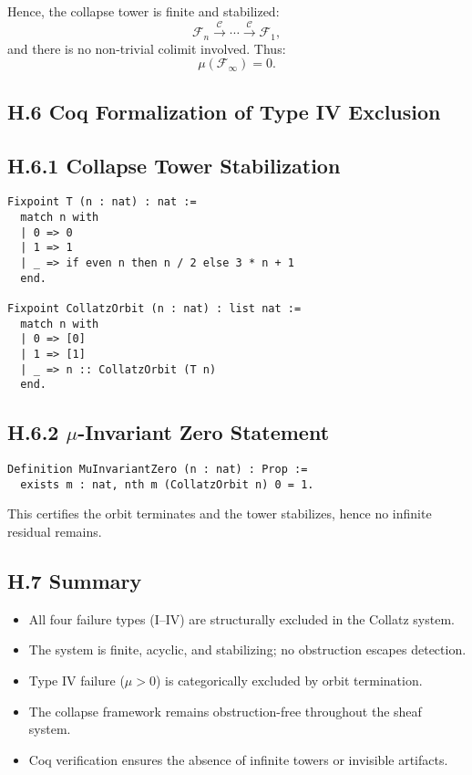 \documentclass[11pt]{article}
\begin{document}
Hence, the collapse tower is finite and stabilized:
\[
\mathcal{F}_n \xrightarrow{\mathcal{C}} \cdots \xrightarrow{\mathcal{C}} \mathcal{F}_1,
\]
and there is no non-trivial colimit involved. Thus:
\[
\mu(\mathcal{F}_\infty) = 0.
\]

\subsection*{H.6 Coq Formalization of Type IV Exclusion}

\subsection*{H.6.1 Collapse Tower Stabilization}

\begin{lstlisting}[language=Coq]
Fixpoint T (n : nat) : nat :=
  match n with
  | 0 => 0
  | 1 => 1
  | _ => if even n then n / 2 else 3 * n + 1
  end.

Fixpoint CollatzOrbit (n : nat) : list nat :=
  match n with
  | 0 => [0]
  | 1 => [1]
  | _ => n :: CollatzOrbit (T n)
  end.
\end{lstlisting}

\subsection*{H.6.2 \( \mu \)-Invariant Zero Statement}

\begin{lstlisting}[language=Coq]
Definition MuInvariantZero (n : nat) : Prop :=
  exists m : nat, nth m (CollatzOrbit n) 0 = 1.
\end{lstlisting}

This certifies the orbit terminates and the tower stabilizes, hence no infinite residual remains.

\subsection*{H.7 Summary}

\begin{itemize}
  \item All four failure types (I–IV) are structurally excluded in the Collatz system.
  \item The system is finite, acyclic, and stabilizing; no obstruction escapes detection.
  \item Type IV failure (\( \mu > 0 \)) is categorically excluded by orbit termination.
  \item The collapse framework remains obstruction-free throughout the sheaf system.
  \item Coq verification ensures the absence of infinite towers or invisible artifacts.
\end{itemize}
\end{document}
